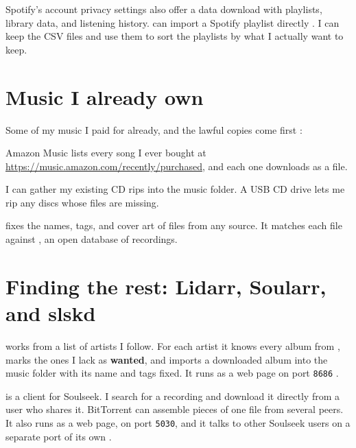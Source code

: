 \documentclass[11pt,a4paper]{article}
\begin{document}
Spotify's account privacy settings also offer a data download with playlists, library data, and listening history.  can import a Spotify playlist directly \cite{explo}. I can keep the CSV files and use them to sort the playlists by what I actually want to keep.

\section{Music I already own}

Some of my music I paid for already, and the lawful copies come first \cite{jeffquit}:

\begin{compactitemize}
  \item Amazon Music lists every song I ever bought at \url{https://music.amazon.com/recently/purchased}, and each one downloads as a file.
  \item {}I can gather my existing CD rips into the music folder. A USB CD drive lets me rip any discs whose files are missing.
  \item {} fixes the names, tags, and cover art of files from any source. It matches each file against , an open database of recordings.
\end{compactitemize}

\section{Finding the rest: Lidarr, Soularr, and slskd}

 works from a list of artists I follow. For each artist it knows every album from , marks the ones I lack as \textbf{wanted}, and imports a downloaded album into the music folder with its name and tags fixed. It runs as a web page on port \texttt{8686} \cite{lidarr}.

 is a client for Soulseek. I search for a recording and download it directly from a user who shares it. BitTorrent can assemble pieces of one file from several peers. It also runs as a web page, on port \texttt{5030}, and it talks to other Soulseek users on a separate port of its own \cite{slskdconf}.
\end{document}
